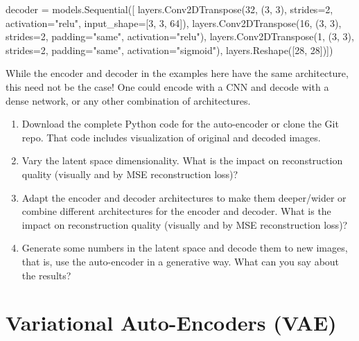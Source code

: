 \begin{withcode}
\begin{pythoncode}
decoder = models.Sequential([
    layers.Conv2DTranspose(32, (3, 3), strides=2, 
               activation="relu", input_shape=[3, 3, 64]),
    layers.Conv2DTranspose(16, (3, 3), strides=2, 
               padding="same", activation="relu"),
    layers.Conv2DTranspose(1, (3, 3), strides=2, 
               padding="same", activation="sigmoid"),
    layers.Reshape([28, 28])])
\end{pythoncode}


\begin{infobox}
While the encoder and decoder in the examples here have the same architecture, this need not be the case! One could encode with a CNN and decode with a dense network, or any other combination of architectures.
\end{infobox}


\begin{exerciseboxcomputer}
\begin{enumerate}
  \item Download the complete Python code for the auto-encoder or clone the Git repo. That code includes visualization of original and decoded images.
  \item Vary the latent space dimensionality. What is the impact on reconstruction quality (visually and by MSE reconstruction loss)?
  \item Adapt the encoder and decoder architectures to make them deeper/wider or combine different architectures for the encoder and decoder. What is the impact on reconstruction quality (visually and by MSE reconstruction loss)?
  \item Generate some numbers in the latent space and decode them to new images, that is, use the auto-encoder in a generative way. What can you say about the results?
\end{enumerate}
\end{exerciseboxcomputer}

\end{withcode}

\FloatBarrier

\section{Variational Auto-Encoders (VAE)}
\label{sec:vae}

